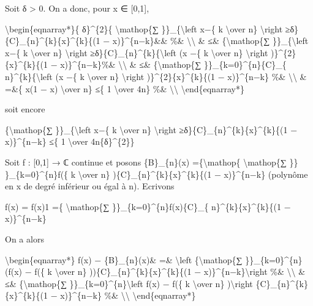 \documentclass[]{article}
\begin{document}
Soit δ \textgreater{} 0. On a donc, pour x ∈ {[}0,1{]},

\textbackslash{}begin\{eqnarray*\}\{ δ\}\^{}\{2\}\{
\textbackslash{}mathop\{∑ \}\}\_\{\textbackslash{}left \textbar{}x−\{ k
\textbackslash{}over n\} \textbackslash{}right
\textbar{}≥δ\}\{C\}\_\{n\}\^{}\{k\}\{x\}\^{}\{k\}\{(1 −
x)\}\^{}\{n−k\}\&\& \%\& \textbackslash{}\textbackslash{} \& ≤\&
\{\textbackslash{}mathop\{∑ \}\}\_\{\textbackslash{}left \textbar{}x−\{
k \textbackslash{}over n\} \textbackslash{}right
\textbar{}≥δ\}\{C\}\_\{n\}\^{}\{k\}\{\textbackslash{}left (x −\{ k
\textbackslash{}over n\} \textbackslash{}right
)\}\^{}\{2\}\{x\}\^{}\{k\}\{(1 − x)\}\^{}\{n−k\}\%\&
\textbackslash{}\textbackslash{} \& ≤\& \{\textbackslash{}mathop\{∑
\}\}\_\{k=0\}\^{}\{n\}\{C\}\_\{ n\}\^{}\{k\}\{\textbackslash{}left (x
−\{ k \textbackslash{}over n\} \textbackslash{}right
)\}\^{}\{2\}\{x\}\^{}\{k\}\{(1 − x)\}\^{}\{n−k\} \%\&
\textbackslash{}\textbackslash{} \& =\&\{ x(1 − x) \textbackslash{}over
n\} ≤\{ 1 \textbackslash{}over 4n\} \%\&
\textbackslash{}\textbackslash{} \textbackslash{}end\{eqnarray*\}

soit encore

\{\textbackslash{}mathop\{∑ \}\}\_\{\textbackslash{}left \textbar{}x−\{
k \textbackslash{}over n\} \textbackslash{}right
\textbar{}≥δ\}\{C\}\_\{n\}\^{}\{k\}\{x\}\^{}\{k\}\{(1 − x)\}\^{}\{n−k\}
≤\{ 1 \textbackslash{}over 4n\{δ\}\^{}\{2\}\}

Soit f : {[}0,1{]} → ℂ continue et posons \{B\}\_\{n\}(x)
=\{\textbackslash{}mathop\{ \textbackslash{}mathop\{∑ \}\}
\}\_\{k=0\}\^{}\{n\}f(\{ k \textbackslash{}over n\}
)\{C\}\_\{n\}\^{}\{k\}\{x\}\^{}\{k\}\{(1 − x)\}\^{}\{n−k\} (polynôme en
x de degré inférieur ou égal à n). Ecrivons

f(x) = f(x)1 =\{ \textbackslash{}mathop\{∑
\}\}\_\{k=0\}\^{}\{n\}f(x)\{C\}\_\{ n\}\^{}\{k\}\{x\}\^{}\{k\}\{(1 −
x)\}\^{}\{n−k\}

On a alors

\textbackslash{}begin\{eqnarray*\} \textbar{}f(x) −
\{B\}\_\{n\}(x)\textbar{}\& =\& \textbackslash{}left
\textbar{}\{\textbackslash{}mathop\{∑ \}\}\_\{k=0\}\^{}\{n\}(f(x) − f(\{
k \textbackslash{}over n\} ))\{C\}\_\{n\}\^{}\{k\}\{x\}\^{}\{k\}\{(1 −
x)\}\^{}\{n−k\}\textbackslash{}right \textbar{}\%\&
\textbackslash{}\textbackslash{} \& ≤\& \{\textbackslash{}mathop\{∑
\}\}\_\{k=0\}\^{}\{n\}\textbackslash{}left \textbar{}f(x) − f(\{ k
\textbackslash{}over n\} )\textbackslash{}right
\textbar{}\{C\}\_\{n\}\^{}\{k\}\{x\}\^{}\{k\}\{(1 − x)\}\^{}\{n−k\} \%\&
\textbackslash{}\textbackslash{} \textbackslash{}end\{eqnarray*\}
\end{document}
